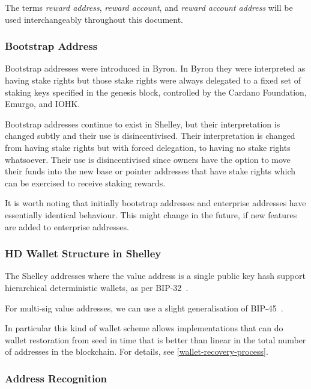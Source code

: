 \documentclass[11pt,a4paper]{article}
\begin{document}
The terms \emph{reward address}, \emph{reward account}, and \emph{reward account
  address} will be used interchangeably throughout this document.

\subsubsection{Bootstrap Address}
\label{bootstrap-address}

Bootstrap addresses were introduced in Byron. In Byron they were
interpreted as having stake rights but those stake rights were always
delegated to a fixed set of staking keys specified in the genesis block,
controlled by the Cardano Foundation, Emurgo, and IOHK.

Bootstrap addresses continue to exist in Shelley, but their
interpretation is changed subtly and their use is disincentivised.
Their interpretation is changed from having stake rights but with
forced delegation, to having no stake rights whatsoever. Their use is
disincentivised since owners have the option to move their funds into
the new base or pointer addresses that have stake rights which can be
exercised to receive staking rewards.

It is worth noting that initially bootstrap addresses and enterprise addresses
have essentially identical behaviour. This might change in the future, if new
features are added to enterprise addresses.

\subsubsection{HD Wallet Structure in Shelley}
\label{hd-wallet-structure-in-shelley}

The Shelley addresses where the value address is a single public key hash
support hierarchical deterministic wallets, as per BIP-32~\citep{bip32}.

For multi-sig value addresses, we can use a slight generalisation of
BIP-45~\citep{bip45}.

In particular this kind of wallet scheme allows implementations that can
do wallet restoration from seed in time that is better than linear in
the total number of addresses in the blockchain. For details, see
\cref{wallet-recovery-process}.

\subsubsection{Address Recognition}
\label{address-recognition-1}
\end{document}
